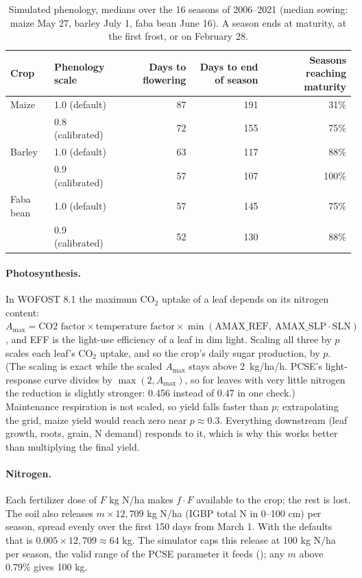 \documentclass[11pt,a4paper]{article}
\newcommand{\code}[1]{\texttt{\detokenize{#1}}}
\begin{document}
\begin{table}[H]
\centering\small
\begin{tabular}{llrrr}
\toprule
Crop & Phenology scale & Days to flowering & Days to end of season & Seasons reaching maturity \\
\midrule
Maize & 1.0 (default) & 87 & 191 & 31\% \\
      & 0.8 (calibrated) & 72 & 155 & 75\% \\
Barley & 1.0 (default) & 63 & 117 & 88\% \\
       & 0.9 (calibrated) & 57 & 107 & 100\% \\
Faba bean & 1.0 (default) & 57 & 145 & 75\% \\
          & 0.9 (calibrated) & 52 & 130 & 88\% \\
\bottomrule
\end{tabular}
\caption{Simulated phenology, medians over the 16 seasons of 2006--2021 (median sowing: maize May 27, barley July 1,
faba bean June 16). A season ends at maturity, at the first frost, or on February 28.}
\label{tab:phen}
\end{table}

\paragraph{Photosynthesis.} In WOFOST 8.1 the maximum CO\(_2\) uptake of a leaf depends on its nitrogen content:
\(A_{\max} = \text{CO2 factor} \times \text{temperature factor} \times \min(\mathrm{AMAX\_REF},\
\mathrm{AMAX\_SLP}\cdot \mathrm{SLN})\), and EFF is the light-use efficiency of a leaf in dim light. Scaling all
three by \(p\) scales each leaf's CO\(_2\) uptake, and so the crop's daily sugar production, by \(p\). (The scaling is
exact while the scaled \(A_{\max}\) stays above 2~kg/ha/h. PCSE's light-response curve divides by
\(\max(2, A_{\max})\), so for leaves with very little nitrogen the reduction is slightly stronger: 0.456 instead of
0.47 in one check.) Maintenance respiration is not scaled, so yield falls faster than \(p\); extrapolating the grid, maize
yield would reach zero near \(p \approx 0.3\). Everything downstream (leaf growth, roots, grain, N demand) responds to it, which is why
this works better than multiplying the final yield.

\paragraph{Nitrogen.} Each fertilizer dose of \(F\) kg N/ha makes \(f \cdot F\) available to the crop; the rest is
lost. The soil also releases \(m \times 12{,}709\) kg N/ha (IGBP total N in 0--100 cm) per season, spread evenly over
the first 150 days from March 1. With the defaults that is \(0.005 \times 12{,}709 \approx 64\) kg. The simulator caps
this release at 100 kg N/ha per season, the valid range of the PCSE parameter it feeds (\code{NSOILBASE}); any
\(m\) above 0.79\% gives 100 kg.
\end{document}
